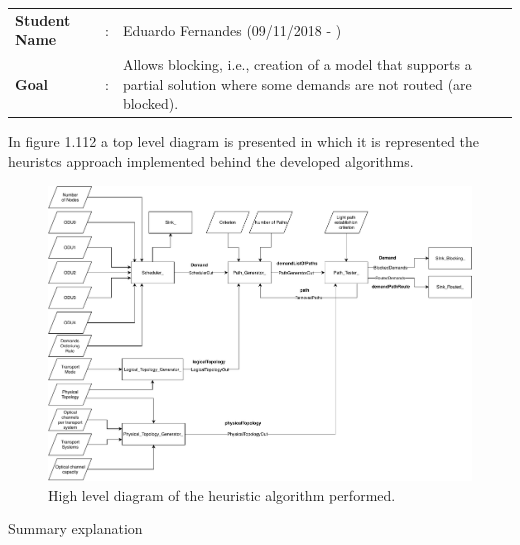 \begin{tcolorbox}	
	\begin{tabular}{p{2.75cm} p{0.2cm} p{10.5cm}} 	
		\textbf{Student Name}   &:& Eduardo Fernandes    (09/11/2018 - )\\
		\textbf{Goal}           &:& Allows blocking, i.e., creation of a model that supports a partial solution where some demands are not routed (are blocked).
	\end{tabular}
\end{tcolorbox}

 \vspace{11pt}
 In figure 1.112 a top level diagram is presented in which it is represented the heuristcs approach implemented behind the developed algorithms. %

\begin{figure}[H]
	\centering
	\includegraphics[width=15cm]{sdf/heuristic/transparent/figures/fluxogramaSemGroomingHighLevel}
	\caption{High level diagram of the heuristic algorithm performed.}
	\label{fluxogram_transparent_surv}
\end{figure}

\Large Summary explanation \\ \\

